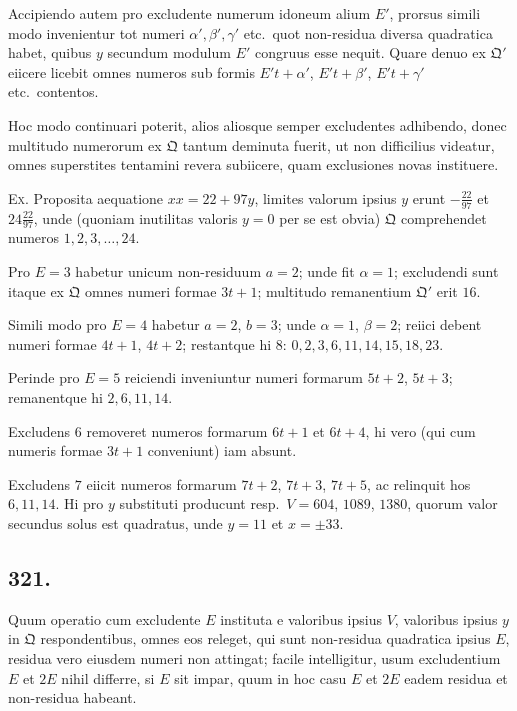 \documentclass[12pt,a4paper]{article}
\theoremstyle{plain}
\theoremstyle{definition}
\theoremstyle{remark}
\begin{document}
Accipiendo autem pro excludente numerum idoneum alium $E'$, prorsus
simili modo invenientur tot numeri $\alpha', \beta', \gamma'$ etc.\ quot non-residua diversa
quadratica habet, quibus $y$ secundum modulum $E'$ congruus esse nequit.
Quare denuo ex $\mathfrak{Q}'$ eiicere licebit omnes numeros sub formis
$E't + \alpha'$, $E't + \beta'$, $E't + \gamma'$ etc.\ contentos.

Hoc modo continuari poterit, alios aliosque semper excludentes adhibendo,
donec multitudo numerorum ex $\mathfrak{Q}$ tantum deminuta fuerit, ut non difficilius
videatur, omnes superstites tentamini revera subiicere, quam exclusiones novas
instituere.

\textsc{Ex.} Proposita aequatione $xx = 22 + 97y$, limites valorum ipsius $y$
erunt $-\tfrac{22}{97}$ et $24\tfrac{22}{97}$, unde (quoniam inutilitas valoris $y = 0$ per se est obvia)
$\mathfrak{Q}$ comprehendet numeros $1, 2, 3, \ldots, 24$.

Pro $E = 3$ habetur unicum non-residuum $a = 2$; unde fit $\alpha = 1$;
excludendi sunt itaque ex $\mathfrak{Q}$ omnes numeri formae $3t + 1$; multitudo
remanentium $\mathfrak{Q}'$ erit $16$.

Simili modo pro $E = 4$ habetur $a = 2$, $b = 3$; unde $\alpha = 1$,
$\beta = 2$; reiici debent numeri formae $4t + 1$, $4t + 2$; restantque hi $8$:
$0, 2, 3, 6, 11, 14, 15, 18, 23$.

Perinde pro $E = 5$ reiciendi inveniuntur numeri formarum $5t + 2$,
$5t + 3$; remanentque hi $2, 6, 11, 14$.

Excludens $6$ removeret numeros formarum $6t + 1$ et $6t + 4$, hi vero
(qui cum numeris formae $3t + 1$ conveniunt) iam absunt.

Excludens $7$ eiicit numeros formarum $7t + 2$, $7t + 3$, $7t + 5$, ac relinquit
hos $6, 11, 14$. Hi pro $y$ substituti producunt resp.\ $V = 604$, $1089$,
$1380$, quorum valor secundus solus est quadratus, unde $y = 11$ et $x = \pm 33$.

\subsection*{321.}

Quum operatio cum excludente $E$ instituta e valoribus ipsius $V$, valoribus
ipsius $y$ in $\mathfrak{Q}$ respondentibus, omnes eos releget, qui sunt non-residua quadratica
ipsius $E$, residua vero eiusdem numeri non attingat; facile intelligitur, usum
excludentium $E$ et $2E$ nihil differre, si $E$ sit impar, quum in hoc casu $E$ et
$2E$ eadem residua et non-residua habeant.
\end{document}

